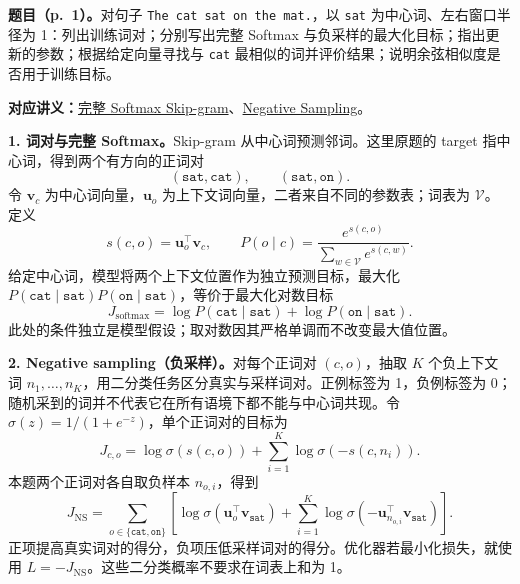 
\begingroup
\linespread{1.15}\selectfont
\setlength{\parskip}{0.4em}
\renewcommand{\recordid}[1]{}
\renewcommand{\relatedtopic}[2]{\hyperref[topic:#1]{#2}}
\label{tutorial:SC4002-TUT07}


\nopagebreak[4]

\textbf{题目（p.~1）。}对句子 \texttt{The cat sat on the mat.}，以 \texttt{sat} 为中心词、左右窗口半径为 1：列出训练词对；分别写出完整 Softmax 与负采样的最大化目标；指出更新的参数；根据给定向量寻找与 \texttt{cat} 最相似的词并评价结果；说明余弦相似度是否用于训练目标。

\textbf{对应讲义：}\relatedtopic{SC4002-L09-T02}{完整 Softmax Skip-gram}、\relatedtopic{SC4002-L09-T03}{Negative Sampling}。

\textbf{1. 词对与完整 Softmax。}Skip-gram 从中心词预测邻词。这里原题的 target 指中心词，得到两个有方向的正词对
\[
 (\texttt{sat},\texttt{cat}),\qquad(\texttt{sat},\texttt{on}).
\]
令 $\mathbf v_c$ 为中心词向量，$\mathbf u_o$ 为上下文词向量，二者来自不同的参数表；词表为 $\mathcal V$。定义
\[
 s(c,o)=\mathbf u_o^\top\mathbf v_c,\qquad
 P(o\mid c)=\frac{e^{s(c,o)}}{\sum_{w\in\mathcal V}e^{s(c,w)}}.
\]
给定中心词，模型将两个上下文位置作为独立预测目标，最大化 $P(\texttt{cat}\mid\texttt{sat})P(\texttt{on}\mid\texttt{sat})$，等价于最大化对数目标
\[
 \boxed{J_{\mathrm{softmax}}=
 \log P(\texttt{cat}\mid\texttt{sat})+
 \log P(\texttt{on}\mid\texttt{sat}).}
\]
此处的条件独立是模型假设；取对数因其严格单调而不改变最大值位置。

\textbf{2. Negative sampling（负采样）。}对每个正词对 $(c,o)$，抽取 $K$ 个负上下文词 $n_1,\ldots,n_K$，用二分类任务区分真实与采样词对。正例标签为 1，负例标签为 0；随机采到的词并不代表它在所有语境下都不能与中心词共现。令 $\sigma(z)=1/(1+e^{-z})$，单个正词对的目标为
\[
 J_{c,o}=\log\sigma(s(c,o))+
 \sum_{i=1}^{K}\log\sigma(-s(c,n_i)).
\]
本题两个正词对各自取负样本 $n_{o,i}$，得到
\[
 \boxed{J_{\mathrm{NS}}=
 \sum_{o\in\{\texttt{cat},\texttt{on}\}}
 \left[\log\sigma(\mathbf u_o^\top\mathbf v_{\texttt{sat}})
 +\sum_{i=1}^{K}\log\sigma(-\mathbf u_{n_{o,i}}^\top\mathbf v_{\texttt{sat}})\right].}
\]
正项提高真实词对的得分，负项压低采样词对的得分。优化器若最小化损失，就使用 $L=-J_{\mathrm{NS}}$。这些二分类概率不要求在词表上和为 1。

